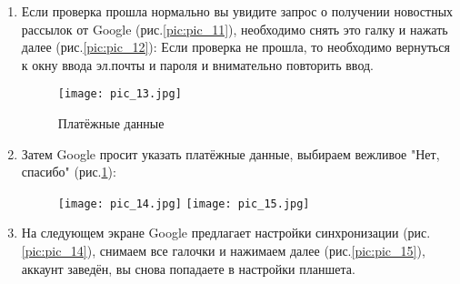 \begin{enumerate}[\thesection .1]
\item Если проверка прошла нормально вы увидите запрос о получении новостных рассылок от Google  (рис.\ref{pic:pic_11}), необходимо снять это галку и нажать далее (рис.\ref{pic:pic_12}):
Если проверка не прошла, то необходимо вернуться к окну ввода эл.почты и пароля и внимательно повторить ввод.  

\newpage
\begin{figure}[H]
	\texttt{[image: pic\_13.jpg]} 
	\caption{Платёжные данные}\label{pic:pic_13}
\end{figure}
\item Затем Google просит указать платёжные данные, выбираем вежливое "Нет, спасибо" (рис.\ref{pic:pic_13}):
  
\begin{figure}[!h]
	\begin{floatrow}
		{\texttt{[image: pic\_14.jpg]}}
		{\texttt{[image: pic\_15.jpg]}}         
	\end{floatrow}
\end{figure}

\item На следующем экране Google предлагает настройки синхронизации (рис.\ref{pic:pic_14}), снимаем все галочки и нажимаем далее (рис.\ref{pic:pic_15}), аккаунт заведён, вы снова попадаете в настройки планшета.

\end{enumerate}